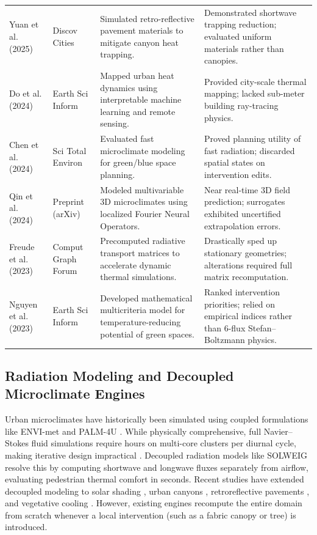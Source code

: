 \documentclass[conference]{IEEEtran}
\begin{document}
\begin{table}[!t]
\begin{tabularx}{\textwidth}{@{}p{2.6cm} p{2.2cm} Y Y@{}}
Yuan et al. (2025) \cite{yuan2025harnessing} & Discov Cities & Simulated retro-reflective pavement materials to mitigate canyon heat trapping. & Demonstrated shortwave trapping reduction; evaluated uniform materials rather than canopies. \\
Do et al. (2024) \cite{do2024geospatial} & Earth Sci Inform & Mapped urban heat dynamics using interpretable machine learning and remote sensing. & Provided city-scale thermal mapping; lacked sub-meter building ray-tracing physics. \\
Chen et al. (2024) \cite{chen2024investigating} & Sci Total Environ & Evaluated fast microclimate modeling for green/blue space planning. & Proved planning utility of fast radiation; discarded spatial states on intervention edits. \\
Qin et al. (2024) \cite{qin2024modeling} & Preprint (arXiv) & Modeled multivariable 3D microclimates using localized Fourier Neural Operators. & Near real-time 3D field prediction; surrogates exhibited uncertified extrapolation errors. \\
Freude et al. (2023) \cite{freude2023precomputed} & Comput Graph Forum & Precomputed radiative transport matrices to accelerate dynamic thermal simulations. & Drastically sped up stationary geometries; alterations required full matrix recomputation. \\
Nguyen et al. (2023) \cite{nguyen2023mathematical} & Earth Sci Inform & Developed mathematical multicriteria model for temperature-reducing potential of green spaces. & Ranked intervention priorities; relied on empirical indices rather than 6-flux Stefan--Boltzmann physics. \\
\bottomrule
\end{tabularx}
\end{table}

\subsection{Radiation Modeling and Decoupled Microclimate Engines}
Urban microclimates have historically been simulated using coupled formulations like ENVI-met \cite{bruse1998simulating} and PALM-4U \cite{eingruber2025simulation}. While physically comprehensive, full Navier--Stokes fluid simulations require hours on multi-core clusters per diurnal cycle, making iterative design impractical \cite{krayenhoff2021cooling}. Decoupled radiation models like SOLWEIG \cite{lindberg2008solweig,lindberg2018urban} resolve this by computing shortwave and longwave fluxes separately from airflow, evaluating pedestrian thermal comfort in seconds. Recent studies have extended decoupled modeling to solar shading \cite{rayegan2025development}, urban canyons \cite{bourquin2025improved}, retroreflective pavements \cite{yuan2025harnessing}, and vegetative cooling \cite{baia2026scalable,chen2024investigating}. However, existing engines recompute the entire domain from scratch whenever a local intervention (such as a fabric canopy or tree) is introduced.
\end{document}
